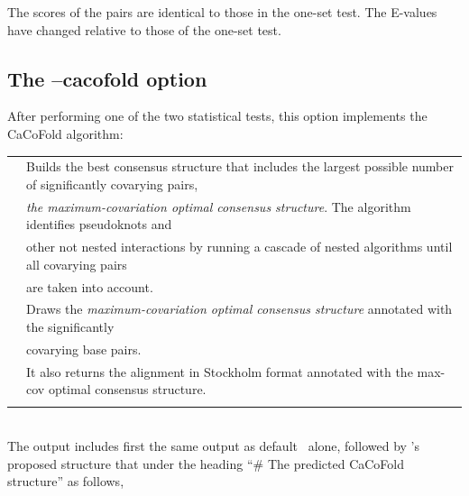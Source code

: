 The scores of the pairs are identical to those in the one-set
test. The E-values have changed relative to those of the one-set test.


\subsection{The --cacofold option}

After performing one of the two statistical tests, this option implements the CaCoFold algorithm:\\

\begin{tabular}{ll}
\textbf{}   & Builds the best consensus structure that includes the largest possible number of significantly covarying pairs,\\
\textbf{}   & \hspace{5mm}\emph{the maximum-covariation optimal consensus structure}. The algorithm identifies pseudoknots and\\
\textbf{}   & \hspace{5mm}other not nested interactions by running a cascade of nested algorithms until all covarying pairs\\
\textbf{}   & \hspace{5mm}are taken into account.\\
\textbf{}   & Draws the \emph{maximum-covariation optimal consensus structure} annotated with the significantly \\
\textbf{}   & \hspace{5mm}covarying base pairs.\\
\textbf{}   & It also returns the alignment in Stockholm format annotated with the max-cov optimal consensus structure.\\
 & \\ 
\end{tabular}

\\

\noindent
The output includes first the same output as default \rscape\ alone,
followed by \rscape's proposed structure that under the heading ``\#
The predicted CaCoFold structure'' as follows,

